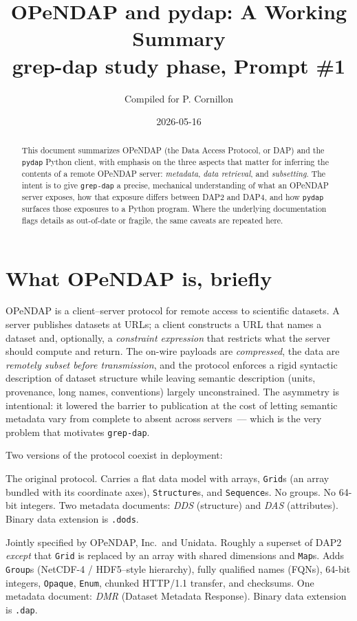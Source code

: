 \documentclass[11pt]{article}
\title{OPeNDAP and pydap: A Working Summary\\
       \large grep-dap study phase, Prompt \#1}
\author{Compiled for P. Cornillon}
\date{2026-05-16}
\begin{document}
\maketitle

\begin{abstract}
This document summarizes OPeNDAP (the Data Access Protocol, or DAP) and
the \texttt{pydap} Python client, with emphasis on the three aspects
that matter for inferring the contents of a remote OPeNDAP server:
\emph{metadata}, \emph{data retrieval}, and \emph{subsetting}. The
intent is to give \texttt{grep-dap} a precise, mechanical understanding
of what an OPeNDAP server exposes, how that exposure differs between
DAP2 and DAP4, and how \texttt{pydap} surfaces those exposures to a
Python program. Where the underlying documentation flags details as
out-of-date or fragile, the same caveats are repeated here.
\end{abstract}

\section{What OPeNDAP is, briefly}

OPeNDAP is a client--server protocol for remote access to scientific
datasets. A server publishes datasets at URLs; a client constructs a
URL that names a dataset and, optionally, a \emph{constraint
expression} that restricts what the server should compute and return.
The on-wire payloads are \emph{compressed}, the data are
\emph{remotely subset before transmission}, and the protocol enforces a
rigid syntactic description of dataset structure while leaving
semantic description (units, provenance, long names, conventions)
largely unconstrained. The asymmetry is intentional: it lowered the
barrier to publication at the cost of letting semantic metadata vary
from complete to absent across servers~--- which is the very problem
that motivates \texttt{grep-dap}.

Two versions of the protocol coexist in deployment:
\begin{description}[leftmargin=2em,style=nextline]
  \item[DAP2 (\textasciitilde 1993--2010s).] The original protocol.
    Carries a flat data model with arrays, \texttt{Grid}s (an array
    bundled with its coordinate axes), \texttt{Structure}s, and
    \texttt{Sequence}s. No groups. No 64-bit integers. Two metadata
    documents: \emph{DDS} (structure) and \emph{DAS} (attributes).
    Binary data extension is \texttt{.dods}.
  \item[DAP4 (2016--).] Jointly specified by OPeNDAP, Inc.\ and
    Unidata. Roughly a superset of DAP2 \emph{except} that
    \texttt{Grid} is replaced by an array with shared dimensions and
    \texttt{Map}s. Adds \texttt{Group}s (NetCDF-4 / HDF5--style
    hierarchy), fully qualified names (FQNs), 64-bit integers,
    \texttt{Opaque}, \texttt{Enum}, chunked HTTP/1.1 transfer, and
    checksums. One metadata document: \emph{DMR} (Dataset Metadata
    Response). Binary data extension is \texttt{.dap}.
\end{description}
\end{document}
